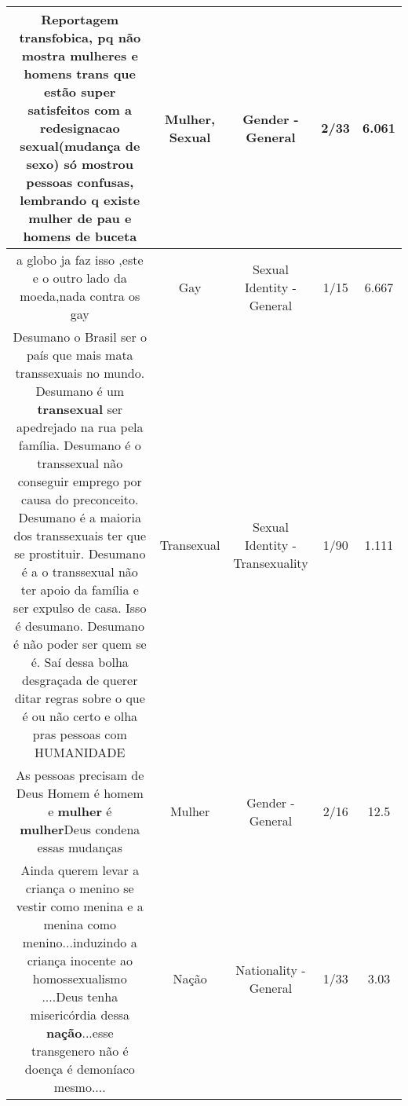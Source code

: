 \documentclass[11pt]{article}
\newlength\mylength
\begin{document}
\begin{center}
\begin{longtable}{|C{.65\mylength}|C{.30\mylength}|C{.12\mylength}|C{.12\mylength}|C{.12\mylength}|}
  \small Reportagem transfobica, pq não mostra mulheres e homens trans que estão super satisfeitos com a redesignacao \textbf{sexual}(mudança de sexo) só mostrou pessoas confusas, lembrando  q existe \textbf{mulher} de pau e homens de buceta\normalsize   & Mulher, Sexual & Gender - General & 2/33 & 6.061 \\  \hline
  \small a globo ja faz isso ,este e o outro lado da moeda,nada contra os gay\normalsize   & Gay & Sexual Identity - General & 1/15 & 6.667 \\  \hline
  \small Desumano o Brasil ser o país que mais mata transsexuais no mundo. Desumano é um \textbf{transexual} ser apedrejado na rua pela família. Desumano é o transsexual não conseguir emprego por causa do preconceito. Desumano é a maioria dos transsexuais ter que se prostituir. Desumano é a o transsexual não ter apoio da família e ser expulso de casa. Isso é desumano. Desumano é não poder ser quem se é. Saí dessa bolha desgraçada de querer ditar regras sobre o que é ou não certo e olha pras pessoas com HUMANIDADE\normalsize   & Transexual & Sexual Identity - Transexuality & 1/90 & 1.111 \\  \hline
  \small As pessoas precisam de Deus Homem é homem e \textbf{mulher} é \textbf{mulher}Deus condena essas  mudanças\normalsize   & Mulher & Gender - General & 2/16 & 12.5 \\  \hline
  \small Ainda querem levar a criança o  menino  se vestir como menina e a menina como menino...induzindo a criança  inocente ao homossexualismo ....Deus tenha misericórdia dessa \textbf{nação}...esse transgenero  não é  doença é  demoníaco mesmo....\normalsize   & Nação & Nationality - General & 1/33 & 3.03 \\  \hline

\end{longtable}
\end{center}
\end{document}
